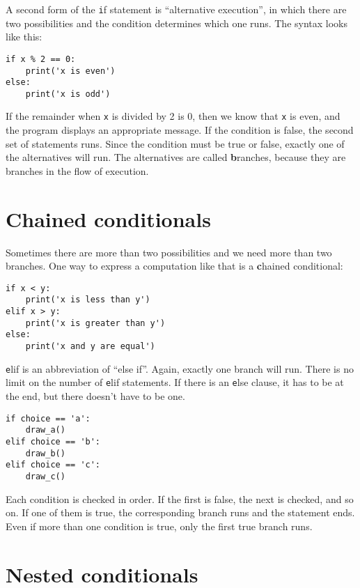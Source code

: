 \documentclass[
DIV=11,
fontsize=13,
twoside,
headinclude=false,
titlepage=firstiscover,
abstract=true,
headsepline=true,
footsepline=true,
chapterprefix=true, %
headings=big,
bibliography=totoc,%
captions=tableheading
]{scrbook}
\theoremstyle{definition}
\begin{document}
A second form of the {\texttt if} statement is ``alternative execution'',
in which there are two possibilities and the condition determines
which one runs.  The syntax looks like this:

\begin{lstlisting}
if x % 2 == 0:
    print('x is even')
else:
    print('x is odd')
\end{lstlisting}
%
If the remainder when {\texttt x} is divided by 2 is 0, then we know that
{\texttt x} is even, and the program displays an appropriate message.  If
the condition is false, the second set of statements runs.
Since the condition must be true or false, exactly one of the
alternatives will run.  The alternatives are called {\textbf
  branches}, because they are branches in the flow of execution.



\section{Chained conditionals}

Sometimes there are more than two possibilities and we need more than
two branches.  One way to express a computation like that is a {\textbf
chained conditional}:

\begin{lstlisting}
if x < y:
    print('x is less than y')
elif x > y:
    print('x is greater than y')
else:
    print('x and y are equal')
\end{lstlisting}
%
{\texttt elif} is an abbreviation of ``else if''.  Again, exactly one
branch will run.  There is no limit on the number of {\texttt
elif} statements.  If there is an {\texttt else} clause, it has to be
at the end, but there doesn't have to be one.

\begin{lstlisting}
if choice == 'a':
    draw_a()
elif choice == 'b':
    draw_b()
elif choice == 'c':
    draw_c()
\end{lstlisting}
%
Each condition is checked in order.  If the first is false,
the next is checked, and so on.  If one of them is
true, the corresponding branch runs and the statement
ends.  Even if more than one condition is true, only the
first true branch runs.  


\section{Nested conditionals}
\end{document}
